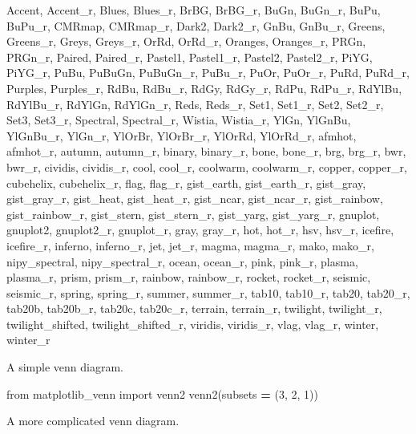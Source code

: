 \documentclass[]{book}
\newenvironment{Shaded}{\begin{snugshade}}{\end{snugshade}}
\newcommand{\DecValTok}[1]{\textcolor[rgb]{0.00,0.00,0.81}{#1}}
\newcommand{\ImportTok}[1]{#1}
\newcommand{\NormalTok}[1]{#1}
\newcommand{\OperatorTok}[1]{\textcolor[rgb]{0.81,0.36,0.00}{\textbf{#1}}}
\begin{document}
\begin{Shaded}
\begin{Highlighting}[]
\NormalTok{Accent, Accent_r, Blues, Blues_r, BrBG, BrBG_r, BuGn, BuGn_r, BuPu, BuPu_r, CMRmap, CMRmap_r, Dark2, Dark2_r, GnBu, GnBu_r, Greens, Greens_r, Greys, Greys_r, OrRd, OrRd_r, Oranges, Oranges_r, PRGn, PRGn_r, Paired, Paired_r, Pastel1, Pastel1_r, Pastel2, Pastel2_r, PiYG, PiYG_r, PuBu, PuBuGn, PuBuGn_r, PuBu_r, PuOr, PuOr_r, PuRd, PuRd_r, Purples, Purples_r, RdBu, RdBu_r, RdGy, RdGy_r, RdPu, RdPu_r, RdYlBu, RdYlBu_r, RdYlGn, RdYlGn_r, Reds, Reds_r, Set1,}
\NormalTok{Set1_r, Set2, Set2_r, Set3, Set3_r, Spectral, Spectral_r, Wistia, Wistia_r, YlGn, YlGnBu, YlGnBu_r, YlGn_r, YlOrBr, YlOrBr_r, YlOrRd, YlOrRd_r, afmhot, afmhot_r, autumn, autumn_r, binary, binary_r, bone, bone_r, brg, brg_r, bwr, bwr_r, cividis, cividis_r, cool, cool_r, coolwarm, coolwarm_r, copper, copper_r, cubehelix, cubehelix_r, flag, flag_r, gist_earth, gist_earth_r, gist_gray, gist_gray_r, gist_heat, gist_heat_r, gist_ncar, gist_ncar_r, gist_rainbow, gist_rainbow_r,}
\NormalTok{gist_stern, gist_stern_r, gist_yarg, gist_yarg_r, gnuplot, gnuplot2, gnuplot2_r, gnuplot_r, gray, gray_r, hot, hot_r, hsv, hsv_r, icefire, icefire_r, inferno, inferno_r, jet, jet_r, magma, magma_r, mako, mako_r, nipy_spectral, nipy_spectral_r, ocean, ocean_r, pink, pink_r, plasma, plasma_r, prism, prism_r, rainbow, rainbow_r, rocket, rocket_r, seismic, seismic_r, spring, spring_r, summer, summer_r, tab10, tab10_r, tab20, tab20_r, tab20b, tab20b_r, tab20c, tab20c_r, terrain, terrain_r,}
\NormalTok{twilight, twilight_r, twilight_shifted, twilight_shifted_r, viridis, viridis_r, vlag, vlag_r, winter, winter_r}
\end{Highlighting}
\end{Shaded}

A simple venn diagram.

\begin{Shaded}
\begin{Highlighting}[]
\ImportTok{from}\NormalTok{ matplotlib_venn }\ImportTok{import}\NormalTok{ venn2}
\NormalTok{venn2(subsets }\OperatorTok{=}\NormalTok{ (}\DecValTok{3}\NormalTok{, }\DecValTok{2}\NormalTok{, }\DecValTok{1}\NormalTok{))}
\end{Highlighting}
\end{Shaded}

A more complicated venn diagram.
\end{document}
